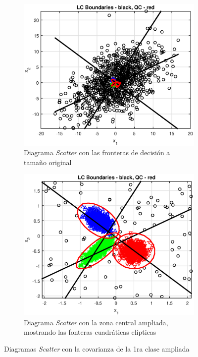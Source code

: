 \documentclass[11pt]{article} %
\begin{document}
\begin{figure}[h]
	\centering
	\begin{subfigure}[b]{0.475 \textwidth}
		\centering
		\includegraphics[width=\textwidth]{../Part_2/caso3_sigma30_nozoom.eps}
		\caption[]{\small Diagrama \emph{Scatter} con las fronteras de decisión a tamaño original}
		\label{fig:c3:mult:nozoom}
	\end{subfigure}
	\quad
	\begin{subfigure}[b]{0.475 \textwidth}
		\centering
		\includegraphics[width=\textwidth]{../Part_2/caso3_sigma30_zoom.eps}
		\caption[]{\small Diagrama \emph{Scatter} con la zona central ampliada, mostrando las fonteras cuadráticas elípticas} 
		\label{fig:c3:mult:zoom}
	\end{subfigure}
	\caption{Diagramas \emph{Scatter} con la covarianza de la 1ra clase ampliada}
	\label{fig:c3:mult}
\end{figure}

\clearpage


\end{document}
